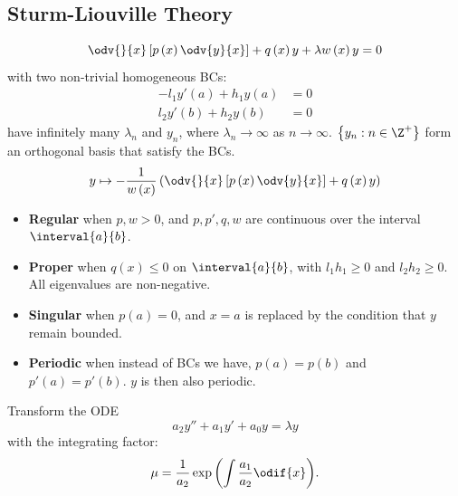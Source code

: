 \documentclass{article}
\begin{document}
\begin{multicols*}{3}
    \section{Sturm-Liouville Theory}
    \begin{equation*}
        \odv{}{x} \left[ p\left( x \right) \odv{y}{x} \right] + q\left( x \right) y + \lambda w\left( x \right) y = 0
    \end{equation*}
    with two non-trivial homogeneous BCs:
    \begin{align*}
        -l_1 y'\left( a \right) + h_1 y\left( a \right) & = 0 \\
        l_2 y'\left( b \right) + h_2 y\left( b \right)  & = 0
    \end{align*}
    have infinitely many \(\lambda_n\) and \(y_n\),
    where \(\lambda_n \to \infty \) as \(n \to \infty\).
    \(\left\{ y_n : n \in \Z^{+} \right\}\) form an orthogonal basis that satisfy the BCs.
    \begin{equation*}
        y \mapsto - \frac{1}{w\left( x \right)} \left( \odv{}{x} \left[ p\left( x \right) \odv{y}{x} \right] + q\left( x \right) y \right)
    \end{equation*}
    \begin{itemize}
        \item \textbf{Regular} when \(p, w > 0\), and \(p, p', q, w\) are continuous
              over the interval \(\interval{a}{b}\).
        \item \textbf{Proper} when \(q\left( x \right) \leqslant 0\) on \(\interval{a}{b}\),
              with \(l_1h_1 \geqslant 0\) and \(l_2h_2 \geqslant 0\).
              All eigenvalues are non-negative.
        \item \textbf{Singular} when \(p\left( a \right) = 0\), and \(x = a\) is replaced by the condition that
              \(y\) remain bounded.
        \item \textbf{Periodic} when instead of BCs we have, \(p\left( a \right) = p\left( b \right)\) and \(p'\left( a \right) = p'\left( b \right)\).
              \(y\) is then also periodic.
    \end{itemize}
    Transform the ODE
    \begin{equation*}
        a_2 y'' + a_1 y' + a_0 y = \lambda y
    \end{equation*}
    with the integrating factor:
    \begin{equation*}
        \mu = \frac{1}{a_2} \exp{\left( \int \frac{a_1}{a_2} \odif{x} \right)}.
    \end{equation*}

\end{multicols*}
\end{document}
